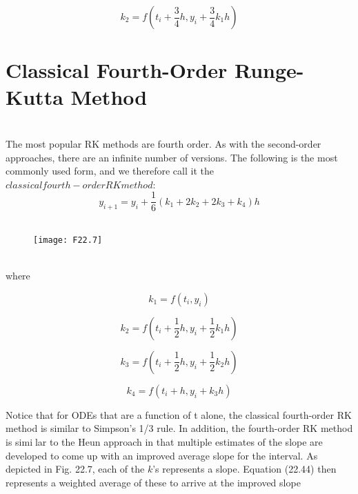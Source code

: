 \begin{equation}
\tag{22.43b}
k_2 = f \left(t_i + \dfrac{3}{4}h, y_i + \dfrac{3}{4}k_1h \right)
\end{equation}
 
 \section{Classical Fourth-Order Runge-Kutta Method}
\\
 The most popular RK methods are fourth order. As with the second-order approaches, there
are an infinite number of versions. The following is the most commonly used form, and we
therefore call it the $classical fourth-order RK method$:
\begin{equation}
\tag{22.44}
y_{i+1} = y_i + \dfrac{1}{6} (k_1 + 2k_2 + 2k_3 + k_4)h
\end{equation}
\\
\begin{figure}[hbt!]
	\texttt{[image: F22.7]}
	\label{F22.7}
\end{figure}\\
 where

\begin{equation}
\tag{22.44a}
k_1 = f(t_i, y_i)
\end{equation}

\begin{equation}
\tag{22.44b}
k_2 = f \left(t_i + \dfrac{1}{2}h, y_i + \dfrac{1}{2} k_1h \right)
\end{equation}

\begin{equation}
\tag{22.44c}
k_3 = f \left(t_i + \dfrac{1}{2}h, y_i + \dfrac{1}{2} k_2h \right)
\end{equation}

\begin{equation}
\tag{22.44d}
k_4 = f(t_i + h, y_i + k_3h)
\end{equation}

Notice that for ODEs that are a function of t alone, the classical fourth-order RK
method is similar to Simpson’s 1/3 rule. In addition, the fourth-order RK method is similar to the Heun approach in that multiple estimates of the slope are developed to come up
with an improved average slope for the interval. As depicted in Fig. 22.7, each of the $k$'s represents a slope. Equation (22.44) then represents a weighted average of these to arrive
at the improved slope\\

